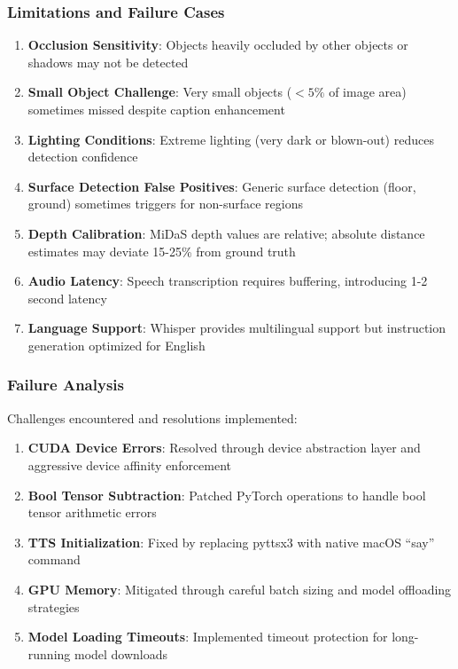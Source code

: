 \documentclass{article}
\begin{document}
\subsubsection{Limitations and Failure Cases}

\begin{enumerate}
    \item \textbf{Occlusion Sensitivity}: Objects heavily occluded by other objects or shadows may not be detected
    \item \textbf{Small Object Challenge}: Very small objects ($< 5\%$ of image area) sometimes missed despite caption enhancement
    \item \textbf{Lighting Conditions}: Extreme lighting (very dark or blown-out) reduces detection confidence
    \item \textbf{Surface Detection False Positives}: Generic surface detection (floor, ground) sometimes triggers for non-surface regions
    \item \textbf{Depth Calibration}: MiDaS depth values are relative; absolute distance estimates may deviate 15-25\% from ground truth
    \item \textbf{Audio Latency}: Speech transcription requires buffering, introducing 1-2 second latency
    \item \textbf{Language Support}: Whisper provides multilingual support but instruction generation optimized for English
\end{enumerate}

\subsubsection{Failure Analysis}

Challenges encountered and resolutions implemented:

\begin{enumerate}
    \item \textbf{CUDA Device Errors}: Resolved through device abstraction layer and aggressive device affinity enforcement
    \item \textbf{Bool Tensor Subtraction}: Patched PyTorch operations to handle bool tensor arithmetic errors
    \item \textbf{TTS Initialization}: Fixed by replacing pyttsx3 with native macOS ``say'' command
    \item \textbf{GPU Memory}: Mitigated through careful batch sizing and model offloading strategies
    \item \textbf{Model Loading Timeouts}: Implemented timeout protection for long-running model downloads
\end{enumerate}
\end{document}
